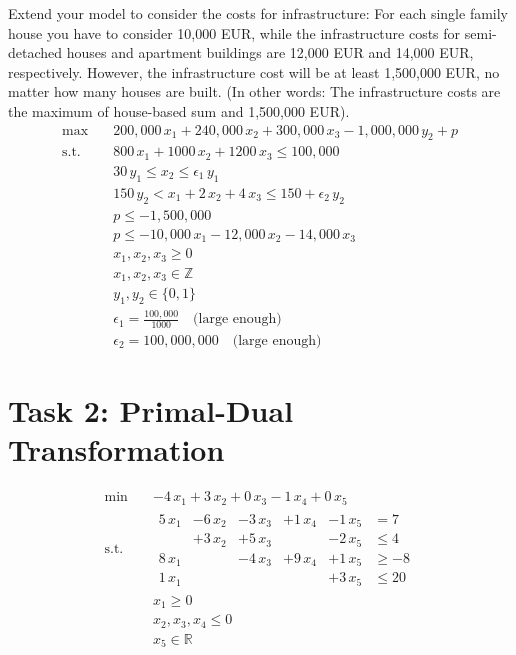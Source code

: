 \documentclass[fleqn,10pt]{wlscirep}
\begin{document}
Extend your model to consider the costs for infrastructure: For each single family house you have to consider 10,000 EUR, while the infrastructure costs for semi-detached houses and apartment buildings are 12,000 EUR and 14,000 EUR, respectively. However, the infrastructure cost will be at least 1,500,000 EUR, no matter how many houses are built. (In other words: The infrastructure costs are the maximum of house-based sum and 1,500,000 EUR).
\begin{align}
    \max \quad& 200,000 \, x_1 + 240,000 \, x_2 + 300,000 \, x_3 - 1,000,000 \, y_2 + p \\
    \text{s.t.} \quad& 800 \, x_1 + 1000 \, x_2 + 1200 \, x_3 \leq 100,000 \\
    & 30 \, y_1 \leq x_2 \leq \epsilon_1 \, y_1 \\
    & 150 \, y_2 < x_1 + 2 \, x_2 + 4 \, x_3 \leq 150 + \epsilon_2 \, y_2 \\
    & p \leq - 1,500,000 \\
    & p \leq - 10,000 \, x_1 - 12,000 \, x_2 - 14,000 \, x_3 \\
    & x_1, x_2, x_3 \geq 0 \\
    & x_1, x_2, x_3 \in \mathbb{Z} \\
    & y_1, y_2 \in \{0, 1 \} \\
    & \epsilon_1 = \frac{100,000}{1000} \quad \text{(large enough)} \\
    & \epsilon_2 = 100,000,000 \quad \text{(large enough)}
\end{align}

\section{Task 2: Primal-Dual Transformation}

\begin{align}
    \min \quad& - 4 \, x_1 + 3 \, x_2 + 0 \, x_3 - 1 \, x_4 + 0 \, x_5 \\
    \text{s.t.} \quad& \begin{array}{rrrrrl}
        5 \, x_1 &- 6 \, x_2 &- 3 \, x_3 &+ 1 \, x_4 &- 1 \, x_5 &= 7  \\
         & + 3 \, x_2 & + 5 \, x_3 & & - 2 \, x_5 &\leq 4  \\
        8 \, x_1 & &- 4 \, x_3 &+ 9 \, x_4 &+ 1 \, x_5 &\geq - 8  \\
        1 \, x_1 & & & &+ 3 \, x_5 &\leq 20
    \end{array} \\
    \quad & x_1 \geq 0 \\
    \quad & x_2, x_3, x_4 \leq 0 \\
    \quad & x_5 \in \mathbb{R}
\end{align}
\end{document}
